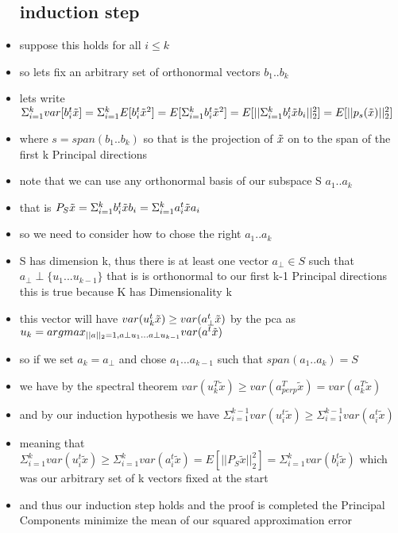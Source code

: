 \documentclass{article}
\begin{document}
\begin{itemize}
\subsection*{induction step}
\item suppose this holds for all $i\leq k$ 
\item so lets fix an arbitrary set of orthonormal vectors $b_1..b_k$
\item lets write $\Sigma_{i=1}^{k}var[b_i^{t}\Tilde{x}]=\Sigma_{i=1}^{k}E[b_i^{t}\Tilde{x}^2]=E[\Sigma_{i=1}^{k}b_i^{t}\Tilde{x}^2]=E[||\Sigma_{i=1}^{k}b_i^{t}\Tilde{x}b_i||_{2}^{2}]=E[||p_{s}(\Tilde{x})||_{2}^{2}]$
\item where $s=span(b_1..b_k)$ so that is the projection of $\Tilde{x}$ on to the span of the first k Principal directions
\item note that we can use any orthonormal basis of our subspace S $a_1..a_k$
\item that is $P_{S}\Tilde{x}=\Sigma_{i=1}^{k}b_i^t\Tilde{x}b_i=\Sigma_{i=1}^{k}a_i^t\Tilde{x}a_i$
\item so we need to consider how to chose the right $a_1..a_k$
\item S has dimension k, thus there is at least one vector $a_{\perp}\in S$ such that $a_{\perp}\perp\{u_1...u_{k-1}\}$ that is is orthonormal to our first k-1 Principal directions this is true because K has Dimensionality k 
\item  this vector will have $var(u_{k}^t\Tilde{x})\geq var(a_{\perp}^{t}\Tilde{x})$ by the pca as $u_{k}=argmax_{||a||_2=1, a\perp u_1... a\perp u_{k-1}}var(a^t\Tilde{x})$
\item so if we set $a_k=a_{\perp}$ and chose $a_1...a_{k-1}$ such that $span(a_1..a_k)=S$ 
\item we have by the spectral theorem $var(u_k^{T}\tilde{x})\geq var(a_{perp}^{T}\tilde{x})= var(a_{k}^{T}\tilde{x})$
\item and by our induction hypothesis we have $\Sigma_{i=1}^{k-1}var(u_i^{t}\tilde{x})\geq \Sigma_{i=1}^{k-1}var(a_i^{t}\tilde{x})$ 
\item meaning that $\Sigma_{i=1}^{k}var(u_i^{t}\tilde{x})\geq \Sigma_{i=1}^{k}var(a_i^{t}\tilde{x})=E[||P_{S}\tilde{x}||_{2}^{2}]=\Sigma_{i=1}^{k}var(b_i^{t}\tilde{x})$ which was our arbitrary set of k vectors fixed at the start 
\item and thus our induction step holds and the proof is completed the Principal Components minimize the mean of our squared approximation error 
\end{itemize}
\end{document}
